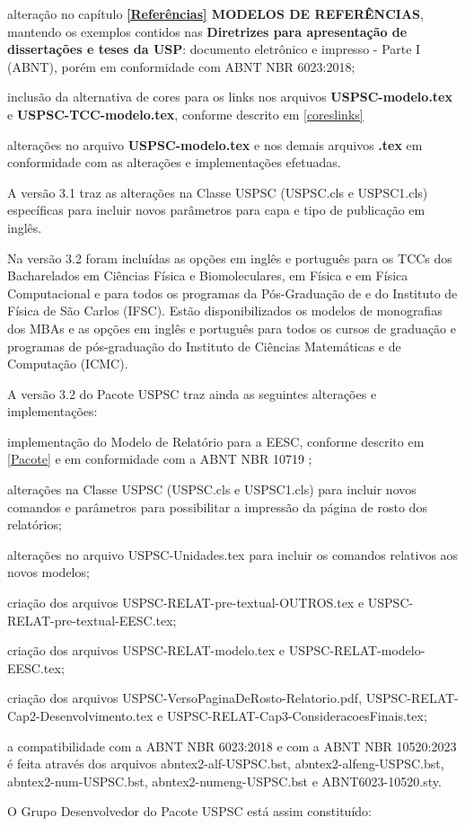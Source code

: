 \begin{alineas}
	\item alteração no capítulo \textbf{\ref{Referências} MODELOS DE REFERÊNCIAS}, mantendo os exemplos contidos nas \textbf{Diretrizes para apresentação de dissertações e teses da USP}: documento eletrônico e impresso - Parte I (ABNT), porém em conformidade com ABNT NBR 6023:2018; 
	\item inclusão da alternativa de cores para os links nos arquivos \textbf{USPSC-modelo.tex} e \textbf{USPSC-TCC-modelo.tex}, conforme descrito em \ref{coreslinks} 
	\item alterações no arquivo \textbf{USPSC-modelo.tex} e nos demais arquivos \textbf{.tex} em conformidade com as alterações e implementações efetuadas.	\\
\end{alineas}

	A versão 3.1 traz as alterações na Classe USPSC (USPSC.cls e USPSC1.cls) específicas para incluir novos parâmetros para capa e tipo de publicação em inglês.
	
	Na versão 3.2 foram incluídas as opções em inglês e português para os TCCs dos Bacharelados em Ciências Física e Biomoleculares, em Física e em Física Computacional e para todos os programas da Pós-Graduação de e do Instituto de Física de São Carlos (IFSC). Estão disponibilizados os modelos de monografias dos MBAs e as opções em inglês e português para todos os cursos de graduação e programas de pós-graduação do Instituto de Ciências Matemáticas e de Computação (ICMC).
	
	A versão 3.2 do Pacote USPSC traz ainda as seguintes alterações e implementações:
	
	\begin{alineas}	 
		\item implementação do Modelo de Relatório para a EESC, conforme descrito em \ref{Pacote} e em conformidade com a ABNT NBR 10719 \cite{nbr107192015};
		\item  alterações na Classe USPSC (USPSC.cls e USPSC1.cls) para incluir novos comandos e parâmetros para possibilitar a impressão da página de rosto dos relatórios;
		\item alterações no arquivo USPSC-Unidades.tex para incluir os comandos relativos aos novos modelos;
		\item criação dos arquivos USPSC-RELAT-pre-textual-OUTROS.tex e USPSC-RELAT-pre-textual-EESC.tex;
		\item criação dos arquivos USPSC-RELAT-modelo.tex e USPSC-RELAT-modelo-EESC.tex;
		\item criação dos arquivos USPSC-VersoPaginaDeRosto-Relatorio.pdf, USPSC-RELAT-Cap2-Desenvolvimento.tex e USPSC-RELAT-Cap3-ConsideracoesFinais.tex;
		\item a compatibilidade com a ABNT NBR 6023:2018 e com a ABNT NBR 10520:2023 é feita através dos arquivos abntex2-alf-USPSC.bst, abntex2-alfeng-USPSC.bst, abntex2-num-USPSC.bst,  abntex2-numeng-USPSC.bst e ABNT6023-10520.sty.
	\end{alineas}
\newpage
	O Grupo Desenvolvedor do Pacote USPSC está assim constituído:

